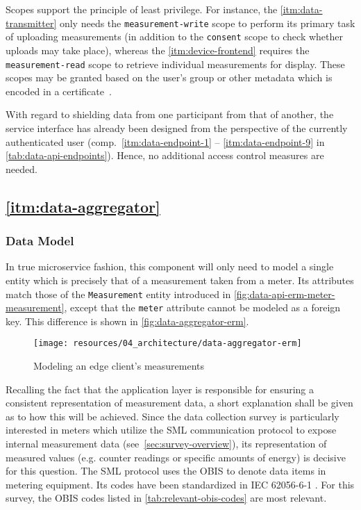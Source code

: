 \begin{description}
\FloatBarrier

	Scopes support the principle of least privilege. For instance, the \ref{itm:data-transmitter} only needs the \texttt{measurement-write} scope to perform its primary task of uploading measurements (in addition to the \texttt{consent} scope to check whether uploads may take place), whereas the \ref{itm:device-frontend} requires the \texttt{measurement-read} scope to retrieve individual measurements for display. These scopes may be granted based on the user's group or other metadata which is encoded in a certificate~\cite[p.~1]{butt2004certificate}.
\FloatBarrier

\end{description}

With regard to shielding data from one participant from that of another, the service interface has already been designed from the perspective of the currently authenticated user (comp.~\ref{itm:data-endpoint-1} -- \ref{itm:data-endpoint-9} in \autoref{tab:data-api-endpoints}). Hence, no additional access control measures are needed.


\subsection{\ref{itm:data-aggregator}}
\label{sec:component-specification-data-aggregator}

\subsubsection{Data Model}
\label{sec:data-aggregator-data-model}

In true microservice fashion, this component will only need to model a single entity which is precisely that of a measurement taken from a meter. Its attributes match those of the \texttt{Measurement} entity introduced in \autoref{fig:data-api-erm-meter-measurement}, except that the \texttt{meter} attribute cannot be modeled as a foreign key. This difference is shown in \autoref{fig:data-aggregator-erm}.

\begin{figure}[hbt]
  \centering
  \texttt{[image: resources/04\_architecture/data-aggregator-erm]}
  \caption{Modeling an edge client's measurements}
  \label{fig:data-aggregator-erm}
\end{figure}

Recalling the fact that the application layer is responsible for ensuring a consistent representation of measurement data, a short explanation shall be given as to how this will be achieved. Since the data collection survey is particularly interested in meters which utilize the \acf{SML} communication protocol to expose internal measurement data (see~\autoref{sec:survey-overview}), its representation of measured values (e.g. counter readings or specific amounts of energy) is decisive for this question. The \ac{SML} protocol uses the \ac{OBIS} to denote data items in metering equipment. Its codes have been standardized in \acs{IEC} 62056-6-1 \cite{iec2017obis}. For this survey, the \ac{OBIS} codes listed in \autoref{tab:relevant-obis-codes} are most relevant.

